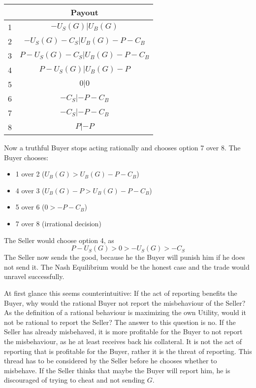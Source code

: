 \documentclass{cacthesis}
\begin{document}
\begin{center}
\begin{tabular}{ |c|c| }
\hline
& Payout  \\
\hline
\hline
1& $-U_S(G) | U_B(G)$\\
\hline
2& $-U_S(G) - C_S| U_B(G)- P - C_B $\\
\hline
3&$P-U_S(G) - C_S | U_B(G) -P - C_B$ \\
\hline
4& $P-U_S(G)| U_B(G)-P$\\
\hline
5& $0|0$\\
\hline 
6& $-C_S |-P - C_B$\\
\hline
7& $- C_S| -P-C_B$\\
\hline
8& $P| -P$\\
\hline
\end{tabular}
\end{center}
Now a truthful Buyer stops acting rationally and chooses option 7 over 8.\newline
The Buyer chooses:
\begin{itemize}
    \item 1 over 2 ($U_B(G) > U_B(G) -P -C_B$)
    \item 4 over 3 ($U_B(G) - P > U_B(G) -P -C_B$)
    \item 5 over 6 ($0 > -P -C_B$)
    \item 7 over 8 (irrational decision)
\end{itemize}
The Seller would choose option 4, as 
\[P-U_S(G)>0>-U_S(G)>-C_S\]
The Seller now sends the good, because he the Buyer will punish him if he does not send it.
The Nash Equilibrium would be the honest case and the trade would unravel successfully.\newline

At first glance this seems counterintuitive: If the act of reporting benefits the Buyer, why would the rational Buyer not report the misbehaviour of the Seller? As the definition of a rational behaviour is maximizing the own Utility, would it not be rational to report the Seller?
The answer to this question is no. If the Seller has already misbehaved, it is more profitable for the Buyer to not report the misbehaviour, as he at least receives back his collateral.
It is not the act of reporting that is profitable for the Buyer, rather it is
the threat of reporting. This thread has to be considered by the Seller before he chooses whether to misbehave. If the Seller thinks that maybe the Buyer will report him, he is discouraged of trying to cheat and not sending $G$.\newline
\end{document}
